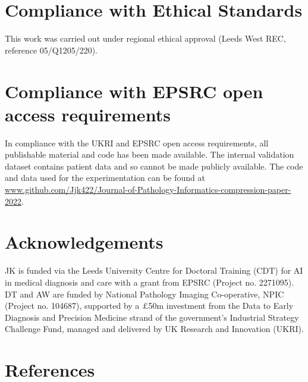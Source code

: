\documentclass[review]{elsarticle}
\begin{document}
\section{Compliance with Ethical Standards}
This work was carried out under regional ethical approval (Leeds West REC,  reference 05/Q1205/220).

\section{Compliance with EPSRC open access requirements}
In compliance with the UKRI and EPSRC open access requirements, all publishable material and code has been made available. The internal validation dataset contains patient data and so cannot be made publicly available. The code and data used for the experimentation can be found at \url{www.github.com/Jjk422/Journal-of-Pathology-Informatics-compression-paper-2022}.

\section{Acknowledgements}
JK is funded via the Leeds University Centre for Doctoral Training (CDT) for AI in medical diagnosis and care with a grant from EPSRC (Project no. 2271095). \\
DT and AW are funded by National Pathology Imaging Co-operative, NPIC (Project no. 104687), supported by a £50m investment from the Data to Early Diagnosis and Precision Medicine strand of the government’s Industrial Strategy Challenge Fund, managed and delivered by UK Research and Innovation (UKRI).

\section{References}




\end{document}
